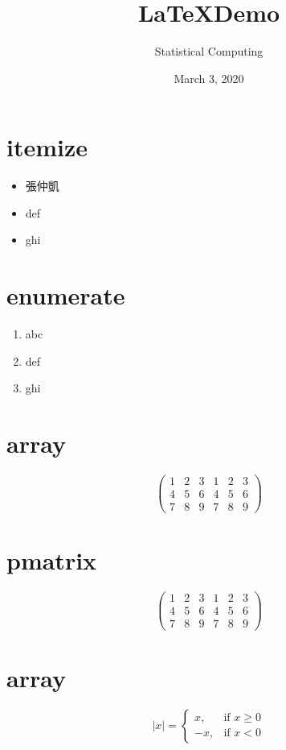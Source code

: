 \documentclass[12pt]{article}  %
\title{\LaTeX Demo}
\author{Statistical Computing}
\date{March 3, 2020}
\begin{document}
\maketitle  %

\section*{itemize}
\begin{itemize}
	\item 張仲凱
	\item def
	\item ghi
\end{itemize}

\section*{enumerate}
\begin{enumerate}[1]
	\item abc
	\item def
	\item ghi
\end{enumerate}


\section*{array}
$$ \left( \begin{array}{cccccc}
1 & 2 & 3 & 1 & 2 & 3 \\
4 & 5 & 6 & 4 & 5 & 6 \\
7 & 8 & 9 & 7 & 8 & 9
\end{array} \right) $$

\section*{pmatrix}
$$ \begin{pmatrix}
1 & 2 & 3 & 1 & 2 & 3 \\
4 & 5 & 6 & 4 & 5 & 6 \\
7 & 8 & 9 & 7 & 8 & 9
\end{pmatrix}$$

\section*{array}
$$|x| = \left\{ \begin{array}{rr}
x,  & \mbox{if $x \geq 0$} \\
-x, & \mbox{if $x < 0$}
\end{array} \right.$$
\end{document}
